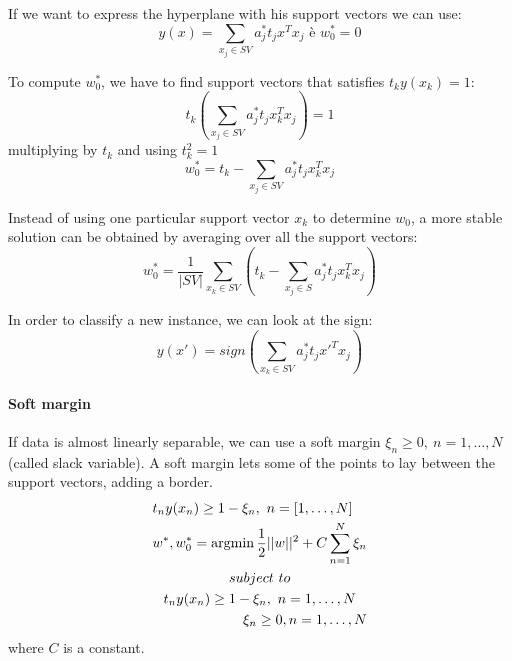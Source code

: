 If we want to express the hyperplane with his support vectors we can use:
\begin{equation}
    y(x) = \sum_{x_{j} \in SV}a_{j}^{*}t_{j}x^{T}x_{j}\text{ è }w_{0}^{*} = 0
\end{equation}

To compute $w_{0}^{*}$, we have to find support vectors that satisfies $t_{k}y(x_{k}) = 1$:
\begin{equation}
    t_{k}(\sum_{x_{j} \in SV}a_{j}^{*}t_{j}x_{k}^{T}x_{j}) = 1
\end{equation}
multiplying by $t_{k}$ and using $t_{k}^{2} = 1$ 
\begin{equation}
    w_{0}^{*} = t_{k} - \sum_{x_{j} \in SV}a_{j}^{*}t_{j}x_{k}^{T}x_{j}
\end{equation}

Instead of using one particular support vector $x_{k}$ to determine $w_{0}$, a more stable solution can be obtained by averaging over all the support vectors:
\begin{equation}
    w_{0}^{*} = \frac{1}{|SV|}\sum_{x_{k} \in SV}\left(t_{k} - \sum_{x_{j} \in S} a_{j}^{*}t_{j}x_{k}^{T}x_{j}\right)
\end{equation}

In order to classify a new instance, we can look at the sign:
\begin{equation}
    y(x') = sign\left(\sum_{x_{k} \in SV} a_{j}^{*}t_{j}x'^{T}x_{j}\right)
\end{equation}

\paragraph{Soft margin}
If data is almost linearly separable, we can use a soft margin $\xi _{n} \geq 0,\ n=1, \dots, N$ (called slack variable).
A soft margin lets some of the points to lay between the support vectors, adding a border.
\begin{equation}
    \begin{multlined}
        t_{n}y(x_{n}) \geq 1 - \xi _{n}, \ n=[1, \dots, N] \\
        w^{*}, w_{0}^{*} = \argmin \frac{1}{2} ||w||^{2} + C\sum_{n=1}^{N}\xi_n{} \\
        subject\ to\\
        t_{n}y(x_{n}) \geq 1 - \xi_{n}, \ n=1, \dots, N\\
        \xi_{n} \geq 0, n=1, \dots, N
    \end{multlined}
\end{equation}
where $C$ is a constant.

